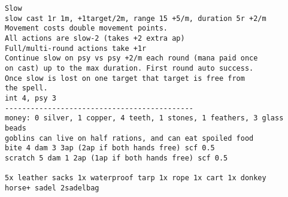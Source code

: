 \begin{samepage}
\begin{verbatim}
Slow
slow cast 1r 1m, +1target/2m, range 15 +5/m, duration 5r +2/m
Movement costs double movement points.
All actions are slow-2 (takes +2 extra ap)
Full/multi-round actions take +1r
Continue slow on psy vs psy +2/m each round (mana paid once
on cast) up to the max duration. First round auto success.
Once slow is lost on one target that target is free from
the spell.
int 4, psy 3
--------------------------------------------
money: 0 silver, 1 copper, 4 teeth, 1 stones, 1 feathers, 3 glass beads
goblins can live on half rations, and can eat spoiled food
bite 4 dam 3 3ap (2ap if both hands free) scf 0.5
scratch 5 dam 1 2ap (1ap if both hands free) scf 0.5

5x leather sacks 1x waterproof tarp 1x rope 1x cart 1x donkey
horse+ sadel 2sadelbag
\end{verbatim} \end{samepage} \normalsize








